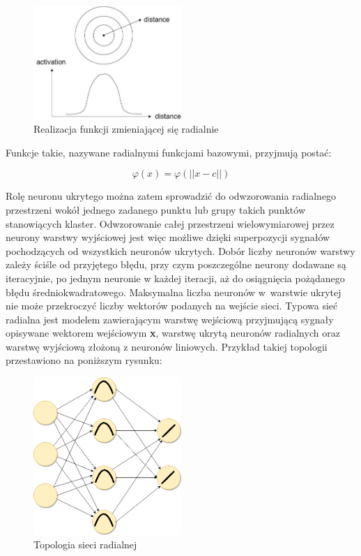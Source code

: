 \documentclass[12pt]{article}
\begin{document}
\begin{figure}[h!]
\centering
	\includegraphics[width=0.5\textwidth]{rbf-gauss.jpeg}\par\vspace{1cm}
\caption{Realizacja funkcji zmieniającej się radialnie}
	\label{fig:features}
\end{figure}

Funkcje takie, nazywane radialnymi funkcjami bazowymi, przyjmują postać: 

\[ \varphi(x) = \varphi(||x-c||) \]

Rolę neuronu ukrytego można zatem sprowadzić do odwzorowania radialnego przestrzeni wokół jednego zadanego punktu lub grupy takich punktów stanowiących klaster. Odwzorowanie całej przestrzeni wielowymiarowej przez neurony warstwy wyjściowej jest więc możliwe dzięki superpozycji sygnałów pochodzących od wszystkich neuronów ukrytych. Dobór liczby neuronów warstwy zależy ściśle od przyjętego błędu, przy czym poszczególne neurony dodawane są iteracyjnie, po jednym neuronie w każdej iteracji, aż do osiągnięcia pożądanego błędu średniokwadratowego. Maksymalna liczba neuronów w~warstwie ukrytej nie może przekroczyć  liczby wektorów podanych na wejście sieci. Typowa sieć radialna jest modelem zawierającym warstwę wejściową przyjmującą sygnały opisywane wektorem wejściowym \textbf{x}, warstwę ukrytą neuronów radialnych oraz warstwę wyjściową złożoną z neuronów liniowych. Przykład takiej topologii przestawiono na poniższym rysunku:

\begin{figure}[h!]
\centering
	\includegraphics[width=0.5\textwidth]{rbf.png}\par\vspace{1cm}
\caption{Topologia sieci radialnej}
	\label{fig:features}
\end{figure}
\end{document}
